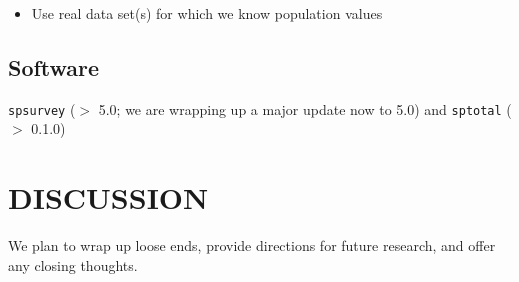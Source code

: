 \begin{itemize}
  \item Use real data set(s) for which we know population values 
\end{itemize}

\subsection{Software}

\texttt{spsurvey} ($>$ 5.0; we are wrapping up a major update now to 5.0) and \texttt{sptotal} ($>$ 0.1.0)


\section{\centering DISCUSSION}\label{sec:discussion}

We plan to wrap up loose ends, provide directions for future research, and offer any closing thoughts.




\clearpage






